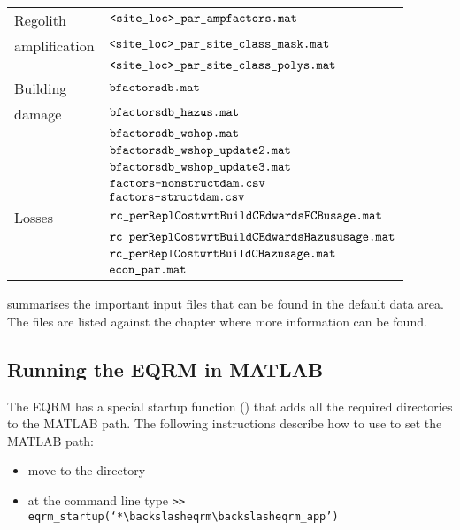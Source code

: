 \begin{table}
\begin{tabular}{|l|p{}|}
\hline
Regolith &  $\typeparfile{<site\_loc>}{\_par}{\_ampfactors}{.mat}$\\
amplification &  $\typeparfile{<site\_loc>\_par}{\_site\_class}{\_mask}{.mat}$ \\
 &  $\typeparfile{<site\_loc>\_par}{\_site\_class}{\_polys}{.mat}$ \\
\hline
Building & $\typeparfile{b}{factors}{db}{.mat}$\\
damage & $\typeparfile{bfactors}{db}{\_hazus}{.mat}$ \\
 & $\typeparfile{bfactors}{db}{\_wshop}{.mat}$ \\
 & $\typeparfile{bfactorsdb}{\_wshop}{\_update2}{.mat}$ \\
 & $\typeparfile{bfactorsdb}{\_wshop}{\_update3}{.mat}$ \\
 & $\typeparfile{factors}{-nonstruct}{dam}{.csv}$ \\
 &  $\typeparfile{factors}{-struct}{dam}{.csv}$ \\
\hline
Losses & $\typeparfilelong{rc\_perRepl}{CostwrtBuildC}{EdwardsFCBusage}{.mat}{rc\_perRepl...EdwardsFCBusage}$ \\
& $\typeparfilelong{rc\_perReplCost}{wrtBuildCEdwards}{Hazususage}{.mat}{rc\_perRepl...EdwardsHazususage}$\\
& $\typeparfile{rc\_perReplCost}{wrtBuildC}{Hazusage}{.mat}$\\
& $\typeparfile{econ}{\_p}{ar}{.mat}$\\
\hline
\end{tabular}
\end{table}

 summarises the important input files
that can be found in the default data area. The files are listed
against the chapter where more information can be found.


\subsection{Running the EQRM in MATLAB}
\label{app:runEQRM}


The EQRM has a special startup function
() that adds all the required
directories to the MATLAB path. The following instructions
describe how to use  to set the MATLAB
path:
\begin{itemize}
\item move to the directory
 \item at the
command line type \newline \texttt{>>
eqrm\_startup(`*$\backslash$eqrm$\backslash$eqrm\_app')}
\end{itemize}

